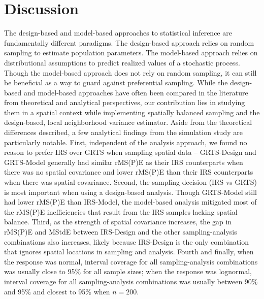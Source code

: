 \documentclass[]{elsarticle} %
\begin{document}
\hypertarget{sec:discussion}{%
\section{Discussion}\label{sec:discussion}}

The design-based and model-based approaches to statistical inference are
fundamentally different paradigms. The design-based approach relies on
random sampling to estimate population parameters. The model-based
approach relies on distributional assumptions to predict realized values
of a stochastic process. Though the model-based approach does not rely
on random sampling, it can still be beneficial as a way to guard against
preferential sampling. While the design-based and model-based approaches
have often been compared in the literature from theoretical and
analytical perspectives, our contribution lies in studying them in a
spatial context while implementing spatially balanced sampling and the
design-based, local neighborhood variance estimator. Aside from the
theoretical differences described, a few analytical findings from the
simulation study are particularly notable. First, independent of the
analysis approach, we found no reason to prefer IRS over GRTS when
sampling spatial data -- GRTS-Design and GRTS-Model generally had
similar rMS(P)E as their IRS counterparts when there was no spatial
covariance and lower rMS(P)E than their IRS counterparts when there was
spatial covariance. Second, the sampling decision (IRS vs GRTS) is most
important when using a design-based analysis. Though GRTS-Model still
had lower rMS(P)E than IRS-Model, the model-based analysis mitigated
most of the rMS(P)E inefficiencies that result from the IRS samples
lacking spatial balance. Third, as the strength of spatial covariance
increases, the gap in rMS(P)E and MStdE between IRS-Design and the other
sampling-analysis combinations also increases, likely because IRS-Design
is the only combination that ignores spatial locations in sampling and
analysis. Fourth and finally, when the response was normal, interval
coverage for all sampling-analysis combinations was usually close to
95\% for all sample sizes; when the response was lognormal, interval
coverage for all sampling-analysis combinations was usually between 90\%
and 95\% and closest to 95\% when \(n = 200\).
\end{document}
